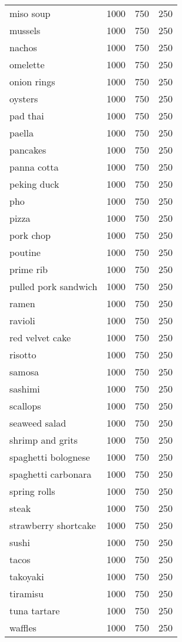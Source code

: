 \begin{center}
\begin{longtable}{|l|l|l|l|}
        miso soup & 1000 & 750 & 250 \\
        mussels & 1000 & 750 & 250 \\
        nachos & 1000 & 750 & 250 \\
        omelette & 1000 & 750 & 250 \\
        onion rings & 1000 & 750 & 250 \\
        oysters & 1000 & 750 & 250 \\
        pad thai & 1000 & 750 & 250 \\
        paella & 1000 & 750 & 250 \\
        pancakes & 1000 & 750 & 250 \\
        panna cotta & 1000 & 750 & 250 \\
        peking duck & 1000 & 750 & 250 \\
        pho & 1000 & 750 & 250 \\
        pizza & 1000 & 750 & 250 \\
        pork chop & 1000 & 750 & 250 \\
        poutine & 1000 & 750 & 250 \\
        prime rib & 1000 & 750 & 250 \\
        pulled pork sandwich & 1000 & 750 & 250 \\
        ramen & 1000 & 750 & 250 \\
        ravioli & 1000 & 750 & 250 \\
        red velvet cake & 1000 & 750 & 250 \\
        risotto & 1000 & 750 & 250 \\
        samosa & 1000 & 750 & 250 \\
        sashimi & 1000 & 750 & 250 \\
        scallops & 1000 & 750 & 250 \\
        seaweed salad & 1000 & 750 & 250 \\
        shrimp and grits & 1000 & 750 & 250 \\
        spaghetti bolognese & 1000 & 750 & 250 \\
        spaghetti carbonara & 1000 & 750 & 250 \\
        spring rolls & 1000 & 750 & 250 \\
        steak & 1000 & 750 & 250 \\
        strawberry shortcake & 1000 & 750 & 250 \\
        sushi & 1000 & 750 & 250 \\
        tacos & 1000 & 750 & 250 \\
        takoyaki & 1000 & 750 & 250 \\
        tiramisu & 1000 & 750 & 250 \\
        tuna tartare & 1000 & 750 & 250 \\
        waffles & 1000 & 750 & 250 \\
    \end{longtable}
\end{center}